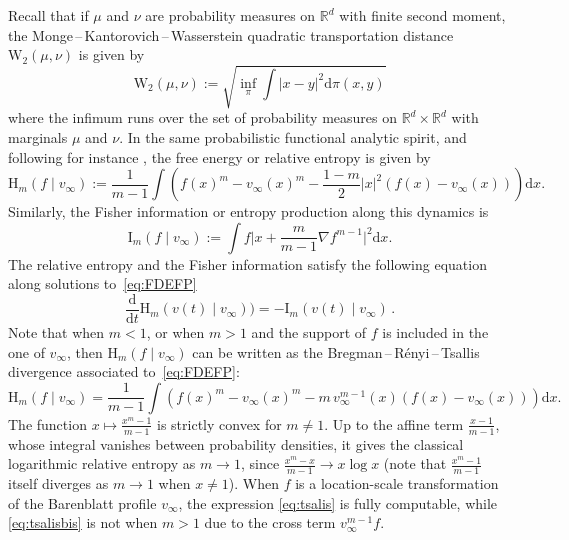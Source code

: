 \documentclass[10pt,reqno]{amsart}
\numberwithin{equation}{section}
\begin{document}
Recall that if $\mu$ and $\nu$ are probability measures on $\mathbb{R}^d$ with finite second moment, the Monge\,--\,Kantorovich\,--\,Wasserstein quadratic transportation distance $\mathrm{W}_2(\mu,\nu)$ is given by
\begin{equation}
\mathrm{W}_2(\mu,\nu):=
\sqrt{\inf_\pi\int|x-y|^2\mathrm{d}\pi(x,y)}
\end{equation}
where the infimum runs over the set of probability measures on $\mathbb{R}^d\times\mathbb{R}^d$ with marginals $\mu$ and $\nu$. In the same probabilistic functional analytic spirit, and following for instance \cite[Chap.~2]{bonforte:hal-02887010},
the free energy or relative entropy is given by
\begin{equation}\label{eq:tsalis}
    \mathrm{H}_m(f\mid v_\infty):=
    \frac{1}{m-1}\int\left(f(x)^m-v_\infty(x)^m-\frac{1-m}{2}|x|^2(f(x)-v_\infty(x))\right)\mathrm{d}x.
\end{equation}
Similarly, the Fisher information or entropy production along this dynamics is
\begin{equation}\label{eq:fisher}
    \mathrm{I}_m(f\mid v_\infty):=\int f\Bigr|x+\frac{m}{m-1}\nabla f^{m-1}\Bigr|^2\mathrm{d}x.
\end{equation}
The relative entropy and the Fisher information satisfy the following equation along solutions to~\eqref{eq:FDEFP}
\begin{equation}
\frac{\mathrm{d}}{\mathrm{d}t}
\mathrm{H}_m(v(t)\mid v_\infty) ) = - \mathrm{I}_m(v(t)\mid v_\infty)\,.
\end{equation}
Note that when $m<1$, or when $m>1$ and the support of $f$ is included in the one of $v_\infty$, then $\mathrm{H}_m(f\mid v_\infty)$ can be written as the Bregman\,--\,Rényi\,--\,Tsallis divergence associated to~\eqref{eq:FDEFP}:
\begin{equation}\label{eq:tsalisbis}
    \mathrm{H}_m(f\mid v_\infty)=
    \frac{1}{m-1}\int\left(f(x)^m-v_\infty(x)^m-m\,v_\infty^{m-1}(x)(f(x)-v_\infty(x))\right)\mathrm{d}x.
\end{equation}
The function $x\mapsto\frac{x^m-1}{m-1}$ is strictly convex for $m\neq1$. Up to the affine term $\frac{x-1}{m-1}$, whose integral vanishes between probability densities, it gives the classical logarithmic relative entropy as $m\to1$, since $\frac{x^m-x}{m-1}\to x\log x$ (note that $\frac{x^m-1}{m-1}$ itself diverges as $m\to1$ when $x\neq1$). 
When $f$ is a location-scale transformation of the Barenblatt profile $v_\infty$, the expression \eqref{eq:tsalis} is fully computable, while 
\eqref{eq:tsalisbis} is not when $m>1$ due to the cross term
$v_\infty^{m-1}f$.
\end{document}
